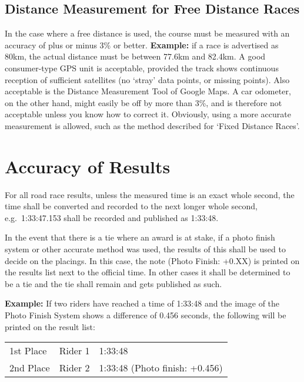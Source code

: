 \subsection {Distance Measurement for Free Distance Races}

In the case where a free distance is used, the course must be measured with an accuracy of plus or minus 3\% or better.
\textbf{Example:} if a race is advertised as 80\unit{km}, the actual distance must be between 77.6\unit{km} and 82.4\unit{km}.
A good consumer-type GPS unit is acceptable, provided the track shows continuous reception of sufficient satellites (no `stray' data points, or missing points).
Also acceptable is the Distance Measurement Tool of Google Maps.
A car odometer, on the other hand, might easily be off by more than 3\%, and is therefore not acceptable unless you know how to correct it.
Obviously, using a more accurate measurement is allowed, such as the method described for `Fixed Distance Races'.

\section{Accuracy of Results}

For all road race results, unless the measured time is an exact whole second, the time shall be converted and recorded to the next longer whole second, e.g.\ 1:33:47.153 shall be recorded and published as 1:33:48.

In the event that there is a tie where an award is at stake, if a photo finish system or other accurate method was used, the results of this shall be used to decide on the placings. In this case, the note (Photo Finish: +0.XX) is printed on the results list next to the official time.
In other cases it shall be determined to be a tie and the tie shall remain and gets published as such.

\textbf{Example:} If two riders have reached a time of 1:33:48 and the image of the Photo Finish System shows a difference of 0.456 seconds, the following will be printed on the result list:\\
\begin{tabular}{l l l}
1st Place & Rider 1 & 1:33:48 \\
2nd Place & Rider 2 & 1:33:48 (Photo finish: +0.456)\\
\end{tabular}
